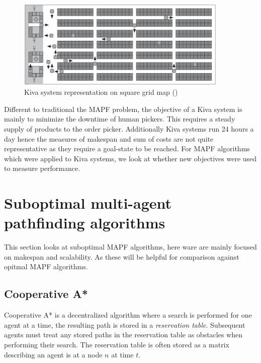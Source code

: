 \documentclass[a4paper,11pt]{article}
\begin{document}
\begin{figure}[h]
	\centering
	\includegraphics[width=0.9\textwidth]{graphics/kivasystemlayout}
	\caption{Kiva system representation on square grid map (\cite{wurman2008coordinating})}
	\label{fig:kivawarehouse}
\end{figure}

Different to traditional the MAPF problem, the objective of a Kiva system is mainly to minimize the downtime of human pickers. This requires a steady supply of products to the order picker. Additionally Kiva systems run 24 hours a day hence the measures of makespan and sum of costs are not quite representative as they require a goal-state to be reached. For MAPF algorithms which were applied to Kiva systems, we look at whether new objectives were used to measure performance.

\section{Suboptimal multi-agent pathfinding algorithms} \label{sec:suboptimal}
This section looks at suboptimal MAPF algorithms, here ware are mainly focused on makespan and scalability. As these will be helpful for comparison against opitmal MAPF algorithms.


\subsection{Cooperative A*}
Cooperative A* is a decentralized algorithm where a search is performed for one agent at a time, the resulting path is stored in a \textit{reservation table}. Subsequent agents must treat any stored paths in the reservation table as obstacles when performing their search. The reservation table is often stored as a matrix describing an agent is at a node $n$ at time $t$.
\end{document}
